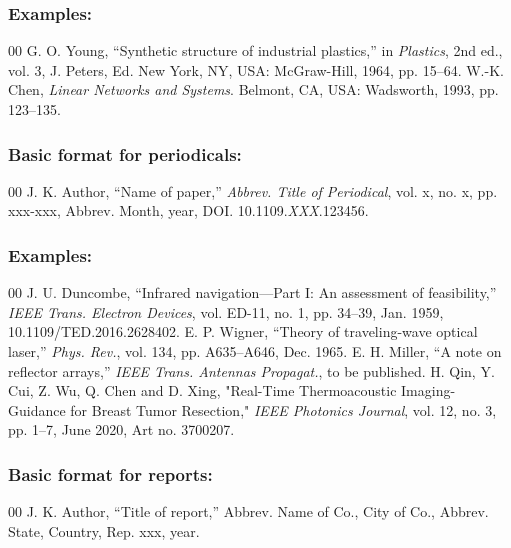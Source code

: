 \documentclass{IEEEoj-data}
\begin{document}
{\subsubsection*{Examples:}

\begin{thebibliography}{00}
 G. O. Young, ``Synthetic structure of industrial
plastics,'' in \emph{Plastics}, 2nd ed., vol. 3, J. Peters, Ed. New York, NY, USA: McGraw-Hill, 1964, pp. 15--64.
 W.-K. Chen, \emph{Linear Networks and Systems}. Belmont, CA, USA: Wadsworth, 1993, pp. 123--135.
\end{thebibliography}

\subsubsection*{Basic format for periodicals:}

\begin{thebibliography}{00}
 J. K. Author, ``Name of paper,'' \textit{Abbrev. Title of Periodical}, vol. x, no. x, pp. xxx-xxx, Abbrev. Month, year, DOI.
10.1109.\textit{XXX}.123456.
\end{thebibliography}

\subsubsection*{Examples:}

\begin{thebibliography}{00}
 J. U. Duncombe, ``Infrared navigation---Part I: An
assessment of feasibility,'' \emph{IEEE Trans. Electron Devices}, vol. ED-11, no. 1, pp. 34--39, Jan. 1959, 10.1109/TED.2016.2628402.
 E. P. Wigner, ``Theory of traveling-wave optical laser,'' 
\emph{Phys. Rev.}, vol. 134, pp. A635--A646, Dec. 1965.
 E. H. Miller, ``A note on reflector arrays,'' \emph{IEEE
Trans. Antennas Propagat.}, to be published.
 H. Qin, Y. Cui, Z. Wu, Q. Chen and D. Xing, "Real-Time
Thermoacoustic Imaging-Guidance for Breast Tumor Resection," \emph{IEEE Photonics Journal}, vol. 12, no. 3, pp. 1--7, June 2020, Art no. 3700207.
\end{thebibliography}

\subsubsection*{Basic format for reports:}

\begin{thebibliography}{00}
 J. K. Author, ``Title of report,'' Abbrev. Name of Co., City of Co., Abbrev.
State, Country, Rep. {xxx}, year.
\end{thebibliography}

}
\end{document}
